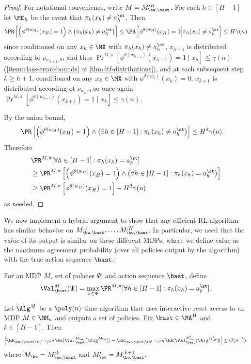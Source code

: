 \begin{proof}
For notational convenience, write $M = M^{:H}_{\bw,\bast}$. For each $h \in [H-1]$ let $\ME_h$ be the event that $\pi_h(x_h) \neq a^\st_h$. Then
\[\Pr\left[\left(\phi^{\theta(w_H)}(x_H) = 1\right) \land \left(\pi_h(x_h)\neq a^\st_h\right)\right] \leq \Pr\left[\phi^{\theta(w_H)}(x_H)=1 \middle| \pi_h(x_h)\neq a^\st_h\right] \leq H\gamma(n)\]
since conditioned on any $x_h \in \MX$ with $\pi_h(x_h) \neq a^\st_h$, $x_{h+1}$ is distributed according to $\nu_{w_{h+1},0}$, and thus $\Pr^{M,\pi}[\phi^{\theta(w_{h+1})}(x_{h+1})=1 \mid{}x_h] \leq \gamma(n)$ (\cref{item:class-error-bounds} of \cref{thm:ltf-distributions}), and at each subsequent step $k \geq h+1$, conditioned on any $x_k \in \MX$ with $\phi^{\theta(w_k)}(x_k) = 0$, $x_{k+1}$ is distributed according ot $\nu_{w_k,0}$ so once again $\Pr^{M,\pi}[\phi^{\theta(w_{k+1})}(x_{k+1})=1 \mid{}x_k] \leq \gamma(n)$. 

By the union bound,
\begin{align*}
\Pr\left[\left(\phi^{\theta(w_H)}(x_H) = 1\right) \land \left(\exists h\in[H-1]: \pi_h(x_h)\neq a^\st_h\right)\right] 
&\leq H^2\gamma(n).
\end{align*}
Therefore
\begin{align*}
&\Pr^{M,\pi}[\forall h \in [H-1]: \pi_h(x_h) = a^\st_h] \\ 
&\geq \Pr^{M,\pi}\left[\left(\phi^{\theta(w_H)}(x_H) = 1\right) \land \left(\forall h\in[H-1]: \pi_h(x_h)= a^\st_h\right)\right] \\
&\geq \Pr^{M,\pi}\left[\phi^{\theta(w_H)}(x_H) = 1\right] - H^2\gamma(n)
\end{align*}
as needed.
\end{proof}

We now implement a hybrid argument to show that any efficient RL algorithm has similar behavior on $M^{:1}_{\bw,\bast},\dots,M^{:H}_{\bw,\bast}$. In particular, we need that the \emph{value} of its output is similar on these different MDPs, where we define value as the maximum agreement probability (over all policies output by the algorithm) with the true action sequence $\bast$: 

\begin{definition}
For an MDP $M$, set of policies $\Psi$, and action sequence $\bast$, define 
\[\Val^M_{\bast}(\Psi) = \max_{\pi\in\Psi} \Pr^{M,\pi}[\forall h \in [H-1]: \pi_h(x_h) = a^\st_h].\]
\end{definition}

\begin{lemma}\label{lemma:hybrid}
Let $\Alg^M$ be a $\poly(n)$-time algorithm that uses interactive reset access to an MDP $M \in \MM_n$ and outputs a set of policies. Fix $\bast \in \MA^H$ and $k \in [H-1]$. Then
\[\left| \EE_{\bw\sim\Unif(\fS^{t-1})^{\otimes H}}\EE[\Val^{M_{\bw}}_{\bast}(\Alg^{M_{\bw}})] - \EE_{\bw\sim\Unif(\fS^{t-1})^{\otimes H}}\EE[\Val^{M'_{\bw}}_{\bast}(\Alg^{M'_{\bw}})]\right| \leq O(n^{-5}).\]
where $M_{\bw} = M^{:k}_{\bw,\bast}$ and $M'_{\bw} = M^{:k+1}_{\bw,\bast}$.
\end{lemma}

